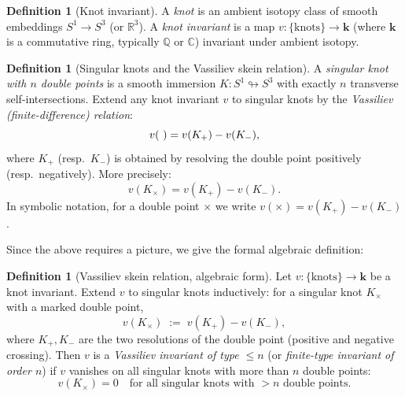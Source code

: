 \documentclass[12pt,a4paper]{amsart}
\theoremstyle{definition}
\newtheorem{definition}[theorem]{Definition}
\newcommand{\Q}{\mathbb{Q}}
\newcommand{\R}{\mathbb{R}}
\newcommand{\C}{\mathbb{C}}
\begin{document}
\begin{definition}[Knot invariant]
A \emph{knot} is an ambient isotopy class of smooth embeddings $S^1 \to S^3$
(or $\R^3$).  A \emph{knot invariant} is a map $v: \{\text{knots}\} \to \mathbf{k}$
(where $\mathbf{k}$ is a commutative ring, typically $\Q$ or $\C$) invariant
under ambient isotopy.
\end{definition}

\begin{definition}[Singular knots and the Vassiliev skein relation]
A \emph{singular knot with $n$ double points} is a smooth immersion
$K: S^1 \looparrowright S^3$ with exactly $n$ transverse self-intersections.
Extend any knot invariant $v$ to singular knots by the \emph{Vassiliev
(finite-difference) relation}:
\[
  v\!\left(\,\begin{tikzpicture}[baseline=-2pt,scale=0.35]
  \end{tikzpicture}\,\right)
  = v(K_+) - v(K_-),
\]
where $K_+$ (resp.\ $K_-$) is obtained by resolving the double point
positively (resp.\ negatively).  More precisely:
\[
  v(K_\times) = v(K_+) - v(K_-).
\]
In symbolic notation, for a double point $\times$ we write
$v(\times) = v(K_+) - v(K_-)$.
\end{definition}

Since the above requires a picture, we give the formal algebraic definition:

\begin{definition}[Vassiliev skein relation, algebraic form]\label{def:vassiliev}
Let $v: \{\text{knots}\} \to \mathbf{k}$ be a knot invariant.  Extend $v$ to
singular knots inductively: for a singular knot $K_\times$ with a marked
double point,
\[
  v(K_\times) \;:=\; v(K_+) - v(K_-),
\]
where $K_+, K_-$ are the two resolutions of the double point (positive and
negative crossing).  Then $v$ is a \emph{Vassiliev invariant of type $\leq n$}
(or \emph{finite-type invariant of order $n$}) if $v$ vanishes on all singular
knots with more than $n$ double points:
\[
  v(K_\times) = 0 \quad \text{for all singular knots with } > n \text{ double points}.
\]
\end{definition}
\end{document}
